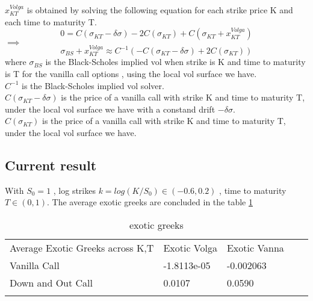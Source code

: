 \documentclass[12pt]{article}
\numberwithin{equation}{section}
\begin{document}
$x_{KT}^{Volga}$ is obtained by solving the following equation for each strike price K and each time to maturity T.\\
\[
    0=C(\sigma_{KT}-\delta \sigma)-2C(\sigma_{KT})+C(\sigma_{KT}+x_{KT}^{Volga})
\]
$\implies$
\[
    \sigma_{BS}+x_{KT}^{Volga} \approx C^{-1}(-C(\sigma_{KT}-\delta \sigma)+2C(\sigma_{KT}))
\]
where $\sigma_{BS}$ is the Black-Scholes implied vol when strike is K and time to maturity is T for the vanilla call options , using the local vol surface we have.\\
$C^{-1}$ is the Black-Scholes implied vol solver.\\
$C(\sigma_{KT}-\delta \sigma)$ is the price of a vanilla call with strike K and time to maturity T, under the local vol surface we have with a constand drift $-\delta \sigma$.\\
$C(\sigma_{KT})$ is the price of a vanilla call with strike K and time to maturity T, under the local vol surface we have.\\

\subsection{Current result}
With $S_0=1$ , log strikes $k=log(K/S_0) \in (-0.6,0.2)$ , time to maturity $T \in (0,1)$. The average exotic greeks are concluded in the table \ref{table:exotic greeks}
\begin{table}[]
    \begin{tabular}{lllll}
    \cline{1-3}
    \multicolumn{1}{|l|}{Average Exotic Greeks across K,T} & \multicolumn{1}{l|}{Exotic Volga} & \multicolumn{1}{l|}{Exotic Vanna} &  &  \\ \cline{1-3}
    \multicolumn{1}{|l|}{Vanilla Call}                     & \multicolumn{1}{l|}{-1.8113e-05}  & \multicolumn{1}{l|}{-0.002063}    &  &  \\ \cline{1-3}
    \multicolumn{1}{|l|}{Down and Out Call}                & \multicolumn{1}{l|}{0.0107}       & \multicolumn{1}{l|}{0.0590}       &  &  \\ \cline{1-3}
                                                           &                                   &                                   &  & 
    \end{tabular}
    \caption{exotic greeks}
    \label{table:exotic greeks}
\end{table}


\end{document}
